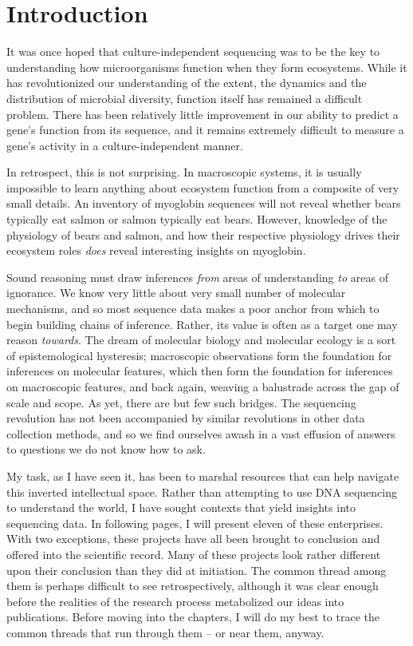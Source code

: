 \section*{Introduction}

It was once hoped that culture-independent sequencing was to be the key to understanding how microorganisms function when they form ecosystems. While it has revolutionized our understanding of the extent, the dynamics and the distribution of microbial diversity, function itself has remained a difficult problem. There has been relatively little improvement in our ability to predict a gene's function from its sequence, and it remains extremely difficult to measure a gene's activity in a culture-independent manner.

In retrospect, this is not surprising. In macroscopic systems, it is usually impossible to learn anything about ecosystem function from a composite of very small details. An inventory of myoglobin sequences will not reveal whether bears typically eat salmon or salmon typically eat bears. However, knowledge of the physiology of bears and salmon, and how their respective physiology drives their ecosystem roles {\em does} reveal interesting insights on myoglobin.

Sound reasoning must draw inferences {\em from} areas of understanding {\em to} areas of ignorance. We know very little about very small number of molecular mechanisms, and so most sequence data makes a poor anchor from which to begin building chains of inference. Rather, its value is often as a target one may reason {\em towards}. The dream of molecular biology and molecular ecology is a sort of epistemological hysteresis; macroscopic observations form the foundation for inferences on molecular features, which then form the foundation for inferences on macroscopic features, and back again, weaving a balustrade across the gap of scale and scope. As yet, there are but few such bridges. The sequencing revolution has not been accompanied by similar revolutions in other data collection methods, and so we find ourselves awash in a vast effusion of answers to questions we do not know how to ask.

My task, as I have seen it, has been to marshal resources that can help navigate this inverted intellectual space. Rather than attempting to use DNA sequencing to understand the world, I have sought contexts that yield insights into sequencing data. In following pages, I will present eleven of these enterprises. With two exceptions, these projects have all been brought to conclusion and offered into the scientific record. Many of these projects look rather different upon their conclusion than they did at initiation. The common thread among them is perhaps difficult to see retrospectively, although it was clear enough before the realities of the research process metabolized our ideas into publications. Before moving into the chapters, I will do my best to trace the common threads that run through them -- or near them, anyway.

